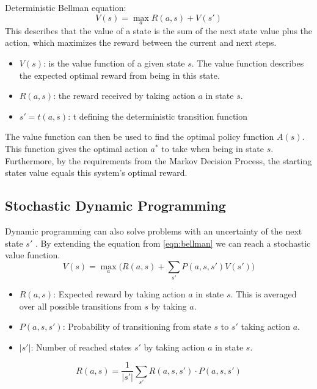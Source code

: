 Deterministic Bellman equation:
\begin{equation}
	\label{eqn:bellman}
	V(s) = \max_a {R(a, s) + V(s')}
\end{equation}
This describes that the value of a state is the sum of the next state value plus the action, which maximizes the reward between the current and next steps.


\begin{itemize}
	\setlength\itemsep{0.5em}
	\item $V(s)$: is the value function of a given state $s$. The value function describes the expected optimal reward from being in this state.
	\item $R(a, s)$: the reward received by taking action $a$ in state $s$.
	\item $s' = t(a,s)$: t defining the deterministic transition function
\end{itemize}

The value function can then be used to find the optimal policy function $A(s)$. This function gives the optimal action $a^*$ to take when being in state $s$.
Furthermore, by the requirements from the Markov Decision Process, the starting states value equals this system's optimal reward.

\subsection{Stochastic Dynamic Programming}
\label{subsec:sdp}
Dynamic programming can also solve problems with an uncertainty of the next state $s'$ \cite{ross2014introduction}. By extending the equation from \ref{eqn:bellman} we can reach a stochastic value function.
\begin{equation}
	\label{eqn:sto_bellman}
	V(s) = \max_a \bigg(R(a, s) + \sum_{s'} P(a, s, s') V(s')\bigg)
\end{equation}

\begin{itemize}
	\setlength\itemsep{0.5em}
	\item $R(a, s)$: Expected reward by taking action $a$ in state $s$. This is averaged over all possible transitions from $s$ by taking $a$.
	\item $P(a, s, s')$: Probability of transitioning from state $s$ to $s'$ taking action $a$.
	\item $|s'|$: Number of reached states $s'$ by taking action $a$ in state $s$. 
\end{itemize}

\begin{equation*}
	R(a, s) = \frac{1}{|s'|} \sum_{s'} R(a, s, s') \cdot P(a, s, s')
\end{equation*}


